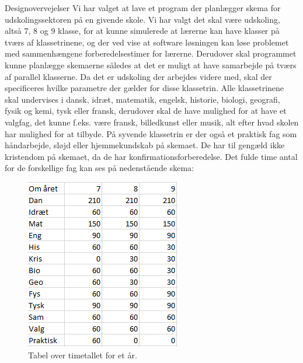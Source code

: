 Designovervejelser
Vi har valget at lave et program der planlægger skema for udskolingssektoren på en givende skole. Vi har valgt det skal være udskoling, altså 7, 8 og 9 klasse, for at kunne simulerede at lærerne kan have klasser på tværs af klassetrinene, og der ved vise at software løsningen kan løse problemet med sammenhængene forberedelsestimer for lærerne. Derudover skal programmet kunne planlægge skemaerne således at det er muligt at have samarbejde på tværs af parallel klasserne.  Da det er udskoling der arbejdes videre med, skal der specificeres hvilke parametre der gælder for disse klassetrin. Alle klassetrinene skal undervises i dansk, idræt, matematik, engelsk, historie, biologi, geografi, fysik og kemi, tysk eller fransk, derudover skal de have mulighed for at have et valgfag, det kunne f.eks. være fransk, billedkunst eller musik, alt efter hvad skolen har mulighed for at tilbyde. På syvende klassetrin er der også et praktisk fag som håndarbejde, sløjd eller hjemmekundskab på skemaet. De har til gengæld ikke kristendom på skemaet, da de har konfirmationsforberedelse\cite{lov2016}. Det fulde time antal for de forskellige fag kan ses på nedenstående skema:
\begin{figure}[!h]
  \centering
  \includegraphics[width=\textwidth]{partials/graphics/antalaftimerpaaetaar.png}
  \caption{Tabel over timetallet for et år.}
  \label{fig:Timetalaar}
\end{figure}

